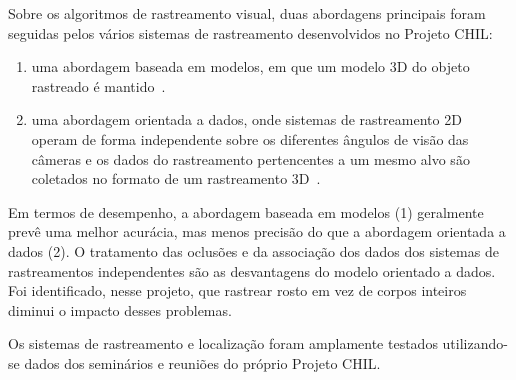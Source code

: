Sobre os algoritmos de rastreamento visual, duas abordagens principais foram seguidas pelos vários sistemas de rastreamento desenvolvidos no Projeto CHIL:

	\begin{enumerate}
		\item uma abordagem baseada em modelos, em que um modelo 3D do objeto rastreado é mantido~\cite{chilref1,chilref2,chilref3}.
		\item  uma abordagem orientada a dados, onde sistemas de rastreamento 2D operam de forma independente sobre os diferentes ângulos de visão das câmeras e os dados do rastreamento pertencentes a um mesmo alvo são coletados no formato de um rastreamento 3D~\cite{chilref4,chilref5}.
	\end{enumerate}	

 Em termos de desempenho, a abordagem baseada em modelos (1) geralmente prevê uma melhor acurácia, mas menos precisão do que a abordagem orientada a dados (2).  O tratamento das oclusões e da associação dos dados dos sistemas de rastreamentos independentes são as desvantagens do modelo orientado a dados. Foi identificado,  nesse projeto, que rastrear rosto em vez de corpos inteiros diminui o impacto desses problemas.

 Os sistemas de rastreamento e localização foram amplamente testados utilizando-se dados dos seminários e reuniões do próprio Projeto CHIL.


	


